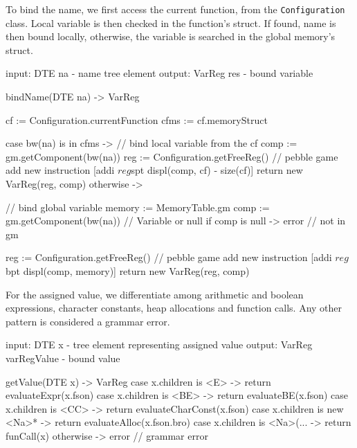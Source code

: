 To bind the name, we first access the current function, from the \verb+Configuration+ class. Local variable
is then checked in the function's struct. If found, name is then bound locally, otherwise, the variable is searched
in the global memory's struct.
\begin{codeblock}[bindName]
input: DTE na - name tree element
output: VarReg res - bound variable

bindName(DTE na) -> VarReg {
    cf := Configuration.currentFunction
    cfms := cf.memoryStruct

    case bw(na) is in cfms -> { // bind local variable from the cf
        comp := gm.getComponent(bw(na))
        reg := Configuration.getFreeReg() // pebble game
        add new instruction [addi $reg $spt displ(comp, cf) - size(cf)]
        return new VarReg(reg, comp)
    }
    otherwise -> { // bind global variable
        memory := MemoryTable.gm
        comp := gm.getComponent(bw(na)) // Variable or null
        if comp is null -> { error } // not in gm

        reg := Configuration.getFreeReg() // pebble game
        add new instruction [addi $reg $bpt displ(comp, memory)]
        return new VarReg(reg, comp)
    }
}
\end{codeblock}

For the assigned value, we differentiate among arithmetic and boolean expressions, character constants,
heap allocations and function calls. Any other pattern is considered a grammar error.
\begin{codeblock}[getValue]
input: DTE x - tree element representing assigned value
output: VarReg varRegValue - bound value

getValue(DTE x) -> VarReg {
    case x.children is <E> -> return evaluateExpr(x.fson)
    case x.children is <BE> -> return evaluateBE(x.fson)
    case x.children is <CC> -> return evaluateCharConst(x.fson)
    case x.children is new <Na>* -> return evaluateAlloc(x.fson.bro)
    case x.children is <Na>(... -> return funCall(x)
    otherwise -> error // grammar error
}
\end{codeblock}

